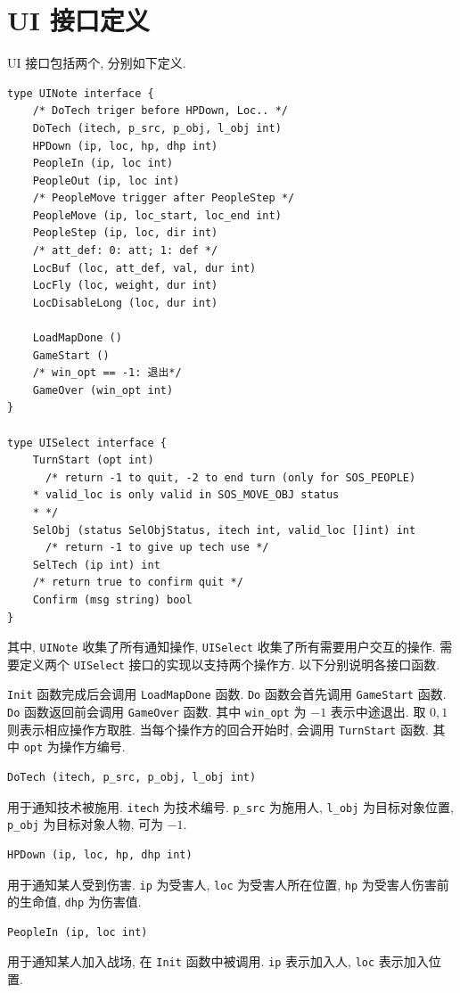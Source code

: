 \documentclass[UTF8, zihao=-4]{ctexart} %
\newcommand{\lcode}{\lstinline} % 段内插入代码
\begin{document}
\section{UI 接口定义}
\label{s_ui}
UI 接口包括两个, 分别如下定义.
\begin{lstlisting}
type UINote interface {
	/* DoTech triger before HPDown, Loc.. */
	DoTech (itech, p_src, p_obj, l_obj int)
	HPDown (ip, loc, hp, dhp int)
	PeopleIn (ip, loc int)
	PeopleOut (ip, loc int)
	/* PeopleMove trigger after PeopleStep */
	PeopleMove (ip, loc_start, loc_end int)
	PeopleStep (ip, loc, dir int)
	/* att_def: 0: att; 1: def */
	LocBuf (loc, att_def, val, dur int)
	LocFly (loc, weight, dur int)
	LocDisableLong (loc, dur int)

	LoadMapDone ()
	GameStart ()
	/* win_opt == -1: 退出*/ 
	GameOver (win_opt int) 
}

type UISelect interface {
	TurnStart (opt int)
      /* return -1 to quit, -2 to end turn (only for SOS_PEOPLE) 
	* valid_loc is only valid in SOS_MOVE_OBJ status
	* */
	SelObj (status SelObjStatus, itech int, valid_loc []int) int 
      /* return -1 to give up tech use */
	SelTech (ip int) int
	/* return true to confirm quit */
	Confirm (msg string) bool 
}
\end{lstlisting}
其中, \lcode{UINote} 收集了所有通知操作, \lcode{UISelect} 收集了所有需要用户交互的操作. 
需要定义两个 \lcode{UISelect} 接口的实现以支持两个操作方. 以下分别说明各接口函数.

\lcode{Init} 函数完成后会调用 \lcode{LoadMapDone} 函数. \lcode{Do} 函数会首先调用 \lcode{GameStart} 函数.
\lcode{Do} 函数返回前会调用 \lcode{GameOver} 函数. 其中 \lcode{win_opt} 为 $-1$ 表示中途退出. 
取 $0, 1$ 则表示相应操作方取胜.
当每个操作方的回合开始时, 会调用 \lcode{TurnStart} 函数. 其中 \lcode{opt} 为操作方编号.

\begin{lstlisting}
DoTech (itech, p_src, p_obj, l_obj int)
\end{lstlisting}
用于通知技术被施用. \lcode{itech} 为技术编号. \lcode{p_src} 为施用人, \lcode{l_obj} 为目标对象位置, \lcode{p_obj} 
为目标对象人物, 可为 $-1$.

\begin{lstlisting}
HPDown (ip, loc, hp, dhp int)
\end{lstlisting}
用于通知某人受到伤害. \lcode{ip} 为受害人, \lcode{loc} 为受害人所在位置, 
\lcode{hp} 为受害人伤害前的生命值,  \lcode{dhp} 为伤害值.

\begin{lstlisting}
PeopleIn (ip, loc int)
\end{lstlisting}
用于通知某人加入战场, 在 \lcode{Init} 函数中被调用.
\lcode{ip} 表示加入人, \lcode{loc} 表示加入位置.
\end{document}
